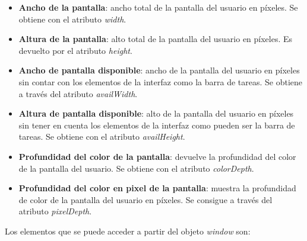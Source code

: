 \begin{itemize} 
    \item \textbf{Ancho de la pantalla}: ancho total de la pantalla del usuario en píxeles. Se obtiene con el atributo \textit{width}.
    \item \textbf{Altura de la pantalla}: alto total de la pantalla del usuario en píxeles. Es devuelto por el atributo \textit{height}.
    \item \textbf{Ancho de pantalla disponible}: ancho de la pantalla del usuario en píxeles sin contar con los elementos de la interfaz como la barra de tareas. Se obtiene a través del atributo \textit{availWidth}.
    \item \textbf{Altura de pantalla disponible}: alto de la pantalla del usuario en píxeles sin tener en cuenta los elementos de la interfaz como pueden ser la barra de tareas. Se obtiene con el atributo \textit{availHeight}.
    \item \textbf{Profundidad del color de la pantalla}: devuelve la profundidad del color de la pantalla del usuario. Se obtiene con el atributo \textit{colorDepth}.
    \item \textbf{Profundidad del color en pixel de la pantalla}: muestra la profundidad de color de la pantalla del usuario en píxeles. Se consigue a través del atributo \textit{pixelDepth}.
\end{itemize}
\noindent  Los elementos que se puede acceder a partir del objeto \textit{window} son:
